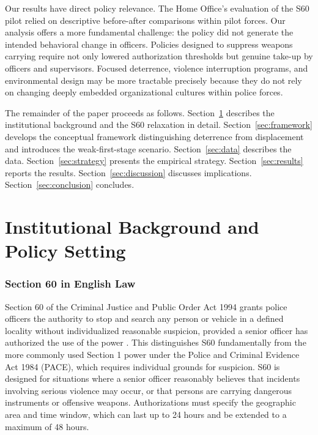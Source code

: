 \documentclass[12pt]{article}
\begin{document}
Our results have direct policy relevance. The Home Office's evaluation of the S60 pilot \citep{homeoffice2020pilot} relied on descriptive before-after comparisons within pilot forces. Our analysis offers a more fundamental challenge: the policy did not generate the intended behavioral change in officers. Policies designed to suppress weapons carrying require not only lowered authorization thresholds but genuine take-up by officers and supervisors. Focused deterrence, violence interruption programs, and environmental design \citep{braga2019, desmarais2021} may be more tractable precisely because they do not rely on changing deeply embedded organizational cultures within police forces.

The remainder of the paper proceeds as follows. Section~\ref{sec:background} describes the institutional background and the S60 relaxation in detail. Section~\ref{sec:framework} develops the conceptual framework distinguishing deterrence from displacement and introduces the weak-first-stage scenario. Section~\ref{sec:data} describes the data. Section~\ref{sec:strategy} presents the empirical strategy. Section~\ref{sec:results} reports the results. Section~\ref{sec:discussion} discusses implications. Section~\ref{sec:conclusion} concludes.


\section{Institutional Background and Policy Setting}
\label{sec:background}

\subsubsection*{Section 60 in English Law}

Section 60 of the Criminal Justice and Public Order Act 1994 grants police officers the authority to stop and search any person or vehicle in a defined locality without individualized reasonable suspicion, provided a senior officer has authorized the use of the power \citep{delsol2015}. This distinguishes S60 fundamentally from the more commonly used Section 1 power under the Police and Criminal Evidence Act 1984 (PACE), which requires individual grounds for suspicion. S60 is designed for situations where a senior officer reasonably believes that incidents involving serious violence may occur, or that persons are carrying dangerous instruments or offensive weapons. Authorizations must specify the geographic area and time window, which can last up to 24 hours and be extended to a maximum of 48 hours.
\end{document}
